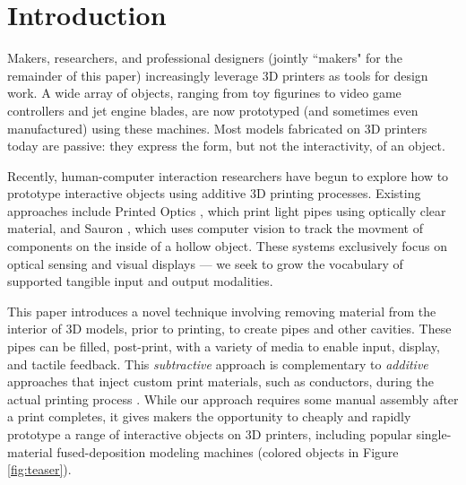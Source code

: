 
\section{Introduction}
Makers, researchers, and professional designers (jointly ``makers" for the remainder of this paper) increasingly leverage 3D printers as tools for design work.  A wide array of objects, ranging from toy figurines to video game controllers and jet engine blades, are now prototyped (and sometimes even manufactured) using these machines.  Most models fabricated on 3D printers today are passive: they express the form, but not the interactivity, of an object.  

Recently, human-computer interaction researchers have begun to explore how to prototype interactive objects using additive 3D printing processes.
Existing approaches include Printed Optics \cite{Willis-printedoptics}, which print light pipes using optically clear material, and Sauron \cite{Savage-sauron}, which uses computer vision to track the movment of components on the inside of a hollow object. These systems exclusively focus on optical sensing and visual displays --- we seek to grow the vocabulary of supported tangible input and output modalities.

This paper introduces a novel technique involving removing material from the interior of 3D models, prior to printing, to create pipes and other cavities.  These pipes can be filled, post-print, with a variety of media to enable input, display, and tactile feedback.  This {\em subtractive} approach is complementary to {\em additive} approaches that inject custom print materials, such as conductors, during the actual printing process \cite{Sells-reprap}. While our approach requires some manual assembly after a print completes, it gives makers the opportunity to cheaply and rapidly prototype a range of interactive objects on 3D printers, including popular single-material fused-deposition modeling machines (colored objects in Figure \ref{fig:teaser}).

